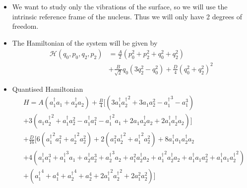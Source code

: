 \documentclass[a4,compress]{beamer}
\newcommand{\ad}[1]{a_{#1}^{\dagger}}       %
\begin{document}

\begin{frame}
  \begin{itemize}
    \item We want to study only the vibrations of the surface, so we will
    use the intrinsic reference frame of the nucleus. Thus we will only have
    2 degrees of freedom.
    \item The Hamiltonian of the system will be given by
    \[
    \begin{split}
      \mathcal{H}(q_0,p_0,q_2,p_2) &= \frac{A}{2}(p_0^2 + p_2^2 + q_0^2 + q_2^2) \\
      &+ \frac{B}{\sqrt{2}}q_0(3q_2^2 - q_0^2)
      + \frac{D}{4}{(q_0^2 + q_2^2)}^2
    \end{split}
    \]
  \end{itemize}
\end{frame}


\begin{frame}
  \begin{itemize}
    \item Quantised Hamiltonian
    \footnotesize
    \[
    \begin{split}
      &H = A \left( \ad{1} a_1 + \ad{2} a_2 \right)
        + \frac{B}{4} \bigg[ \left( 3 \ad{1} {\ad{2}}^2 + 3 a_1 a_2^2
                                   - {\ad{1}}^3 - a_1^3 \right)   \\
      & + 3 \left( a_1 {\ad{2}}^2 + \ad{1} a_2^2 - \ad{1} a_1^2 - {\ad{1}}^2 a_1
                 + 2 a_1 \ad{2} a_2 + 2 \ad{1} \ad{2} a_2
              \right) \bigg]  \\
      & + \frac{D}{16} \bigg[ 6 \left( {\ad{1}}^2 a_1^2 + {\ad{2}}^2 a_2^2 \right)
                            + 2 \left( a_1^2 {\ad{2}}^2 + {\ad{1}}^2 a_2^2 \right)
                            + 8 \ad{1} a_1 \ad{2} a_2  \\
      & + 4 \left(\ad{1} a_1^3 + {\ad{1}}^3 a_1 + \ad{2} a_2^3 + {\ad{2}}^3 a_2
         + a_1^2 \ad{2} a_2 + {\ad{1}}^2 \ad{2} a_2 + \ad{1} a_1 a_2^2 + \ad{1} a_1 {\ad{2}}^2
            \right)  \\
      & + \left( {\ad{1}}^4 + a_1^4 + {\ad{2}}^4 + a_2^4
         + 2 {\ad{1}}^2 {\ad{2}}^2 + 2 a_1^2 a_2^2
          \right)
                            \bigg]
    \end{split}
    \]
  \end{itemize}
\end{frame}
\end{document}
